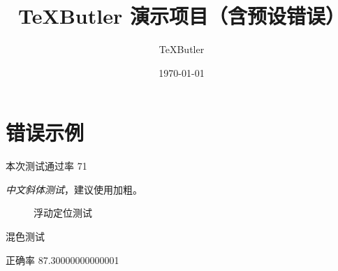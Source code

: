 \documentclass[UTF8]{ctexart}
\title{TeXButler 演示项目（含预设错误）}
\author{TeXButler}
\date{\today}
\begin{document}
\maketitle

\section{错误示例}

本次测试通过率 71%

\textit{中文斜体测试}，建议使用加粗。

\begin{figure}[ht]
\centering
\caption{浮动定位测试}
\end{figure}

{\color{red!60}混色测试}



正确率 87.30000000000001%
\end{document}
